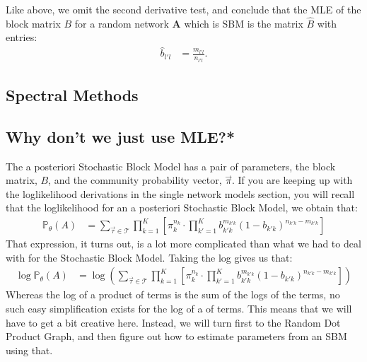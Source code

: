 \documentclass[letterpaper,10pt,english]{jupyterBook}
\begin{document}
\sphinxAtStartPar
Like above, we omit the second derivative test, and conclude that the MLE of the block matrix \(B\) for a random network \(\mathbf A\) which is  SBM is the matrix \(\hat B\) with entries:
\begin{align*}
    \hat b_{l'l} &= \frac{m_{l'l}}{n_{l'l}}.
\end{align*}

\subsection{Spectral Methods}
\label{\detokenize{representations/ch6/estimating-parameters_theory:spectral-methods}}

\subsection{Why don’t we just use MLE?*}
\label{\detokenize{representations/ch6/estimating-parameters_theory:why-don-t-we-just-use-mle}}
\sphinxAtStartPar
The a posteriori Stochastic Block Model has a pair of parameters, the block matrix, \(B\), and the community probability vector, \(\vec \pi\). If you are keeping up with the log\sphinxhyphen{}likelihood derivations in the single network models section, you will recall that the log\sphinxhyphen{}likelihood for an a posteriori Stochastic Block Model, we obtain that:
\begin{align*}
    \mathbb P_\theta(A) &= \sum_{\vec \tau \in \mathcal T} \prod_{k = 1}^K \left[\pi_k^{n_k}\cdot \prod_{k'=1}^K b_{k' k}^{m_{k' k}}(1 - b_{k' k})^{n_{k' k} - m_{k' k}}\right]
\end{align*}
\sphinxAtStartPar
That expression, it turns out, is a lot more complicated than what we had to deal with for the  Stochastic Block Model. Taking the log gives us that:
\begin{align*}
\log 
    \mathbb P_\theta(A) &= \log\left(\sum_{\vec \tau \in \mathcal T} \prod_{k = 1}^K \left[\pi_k^{n_k}\cdot \prod_{k'=1}^K b_{k' k}^{m_{k' k}}(1 - b_{k' k})^{n_{k' k} - m_{k' k}}\right]\right)
\end{align*}
\sphinxAtStartPar
Whereas the log of a product of terms is the sum of the logs of the terms, no such easy simplification exists for the log of a  of terms. This means that we will have to get a bit creative here. Instead, we will turn first to the  Random Dot Product Graph, and then figure out how to estimate parameters from an  SBM using that.
\end{document}
